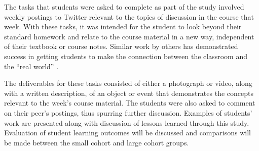 \documentclass[12pt]{article}
\begin{document}
The tasks that students were asked to complete as part of the study involved weekly postings to Twitter relevant to the topics of discussion in the course that week. With these tasks, it was intended for the student to look beyond their standard homework and relate to the course material in a new way, independent of their textbook or course notes. Similar work by others has demonstrated success in getting students to make the connection between the classroom and the “real world” \cite{hopp_journal_2008}.

The deliverables for these tasks consisted of either a photograph or video, along with a written description, of an object or event that demonstrates the concepts relevant to the week’s course material. The students were also asked to comment on their peer's postings, thus spurring further discussion. Examples of students’ work are presented along with discussion of lessons learned through this study. Evaluation of student learning outcomes will be discussed and comparisons will be made between the small cohort and large cohort groups.



\vspace{4\baselineskip}\vspace{-\parskip} %
\footnotesize %


\end{document}
